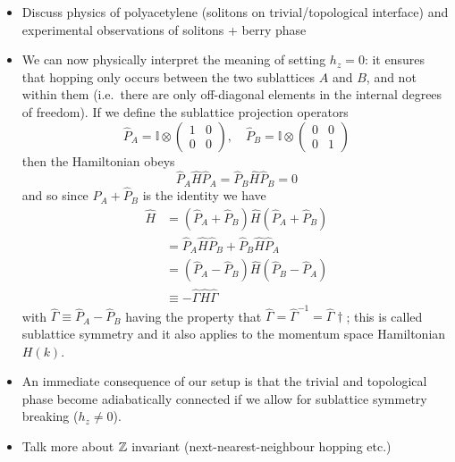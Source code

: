 {\color{blue}
\begin{itemize}
	\item Discuss physics of polyacetylene (solitons on trivial/topological interface) and experimental observations of solitons + berry phase \cites{Meier_SSH-soliton}{Atala_SSH-Zak}
	
	\item We can now physically interpret the meaning of setting $h_z = 0$: it ensures that hopping only occurs between the two sublattices $A$ and $B$, and not within them (i.e.\ there are only off-diagonal elements in the internal degrees of freedom). If we define the sublattice projection operators
	\[
		\hat{P}_A = \mathbb{I} \otimes \begin{pmatrix}
			1 & 0 \\ 0 & 0
		\end{pmatrix},\quad \hat{P}_B = \mathbb{I} \otimes \begin{pmatrix}
			0 & 0 \\ 0 & 1
		\end{pmatrix}
	\]
	then the Hamiltonian obeys
	\[
		\hat{P}_A\hat{H}\hat{P}_A = \hat{P}_B\hat{H}\hat{P}_B = 0
	\]
	and so since $\hat{P}_A + \hat{P}_B$ is the identity we have
	\begin{align*}
		\hat{H} &= (\hat{P}_A + \hat{P}_B)\hat{H}(\hat{P}_A + \hat{P}_B) \\
			&= \hat{P}_A\hat{H}\hat{P}_B + \hat{P}_B\hat{H}\hat{P}_A \\
			&= (\hat{P}_A - \hat{P}_B)\hat{H}(\hat{P}_B - \hat{P}_A) \\
			&\equiv -\hat{\Gamma}\hat{H}\hat{\Gamma}
	\end{align*}
	with $\hat{\Gamma}\equiv\hat{P}_A - \hat{P}_B$ having the property that $\hat{\Gamma} = \hat{\Gamma}^{-1} = \hat{\Gamma}\dagger$; this is called sublattice symmetry and it also applies to the momentum space Hamiltonian $H(k)$.
	
	\item An immediate consequence of our setup is that the trivial and topological phase become adiabatically connected if we allow for sublattice symmetry breaking ($h_z \neq 0$).
	
	\item Talk more about $\mathbb{Z}$ invariant (next-nearest-neighbour hopping etc.)
\end{itemize}
}

%
%	
%	



